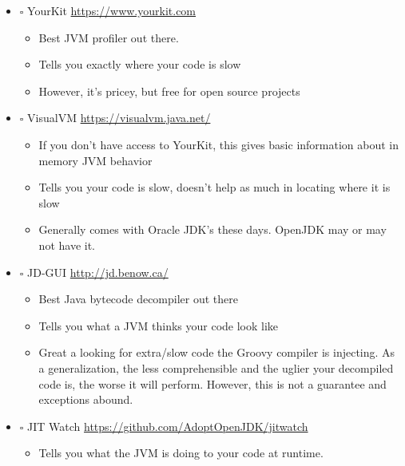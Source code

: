 \documentclass[11pt]{article}
\begin{document}
\begin{itemize}
\item $\square$ YourKit \url{https://www.yourkit.com}

\begin{itemize}
\item Best JVM profiler out there.

\item Tells you exactly where your code is slow

\item However, it's pricey, but free for open source projects
\end{itemize}

\item $\square$ VisualVM \url{https://visualvm.java.net/}

\begin{itemize}
\item If you don't have access to YourKit, this gives basic information about in memory JVM behavior

\item Tells you your code is slow, doesn't help as much in locating where it is slow

\item Generally comes with Oracle JDK's these days. OpenJDK may or may not have it.
\end{itemize}

\item $\square$ JD-GUI \url{http://jd.benow.ca/}

\begin{itemize}
\item Best Java bytecode decompiler out there

\item Tells you what a JVM thinks your code look like

\item Great a looking for extra/slow code the Groovy compiler is injecting. As a generalization, the less comprehensible and the uglier your decompiled code is, the worse it will perform. However, this is not a guarantee and exceptions abound.
\end{itemize}

\item $\square$ JIT Watch \url{https://github.com/AdoptOpenJDK/jitwatch}

\begin{itemize}
\item Tells you what the JVM is doing to your code at runtime.


\end{itemize}
\end{itemize}
\end{document}
